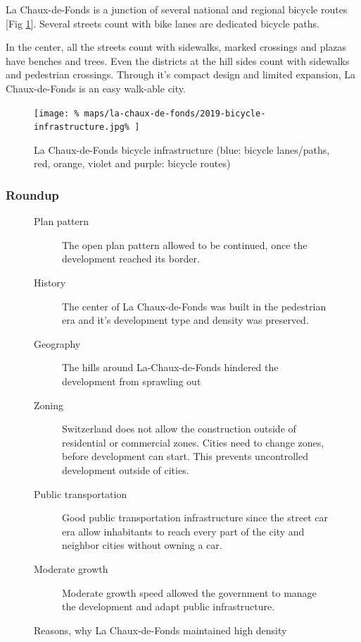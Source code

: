 \documentclass{article}
\begin{document}
\begin{multicols}{2}
			La Chaux-de-Fonds is a junction of several national and regional bicycle routes [Fig \ref{fig:map:la-chaux-de-fonds-bicycle-infrastructure}]. Several streets count with bike lanes are dedicated bicycle paths.
			
			In the center, all the streets count with sidewalks, marked crossings and plazas have benches and trees. Even the districts at the hill sides count with sidewalks and pedestrian crossings.
			Through it's compact design and limited expansion, La Chaux-de-Fonds is an easy walk-able city.
			
			\begin{figure}[H]
				\texttt{[image: \%
					maps/la-chaux-de-fonds/2019-bicycle-infrastructure.jpg\%
				]}
				\caption{La Chaux-de-Fonds bicycle infrastructure (blue: bicycle lanes/paths, red, orange, violet and purple: bicycle routes)  \cite{OpenCycleMap:LaChauxDeFonds}}
				\label{fig:map:la-chaux-de-fonds-bicycle-infrastructure}
			\end{figure}
			
			
			\subsubsection{Roundup}
			
			\begin{figure}[H]
				\begin{description}
					\item [Plan pattern] The open plan pattern allowed to be continued, once the development reached its border.
					\item [History] The center of La Chaux-de-Fonds was built in the pedestrian era and it's development type and density was preserved.
					\item [Geography] The hills around La-Chaux-de-Fonds hindered the development from sprawling out
					\item [Zoning] Switzerland does not allow the construction outside of residential or commercial zones. Cities need to change zones, before development can start. This prevents uncontrolled development outside of cities.
					\item [Public transportation] Good public transportation infrastructure since the street car era allow inhabitants to reach every part of the city and neighbor cities without owning a car.
					\item [Moderate growth] Moderate growth speed allowed the government to manage the development and adapt public infrastructure.
				\end{description}
				\caption{Reasons, why La Chaux-de-Fonds maintained high density}
				\label{fig:la-chaux-de-fonds-development-reasons}
			\end{figure}
			

\end{multicols}
\end{document}
